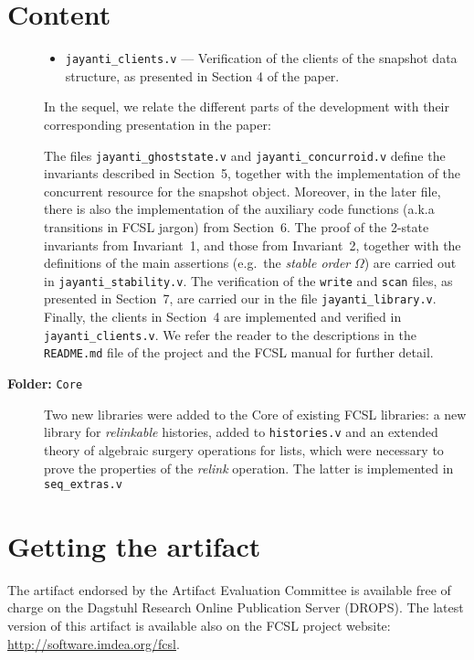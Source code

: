 \documentclass[a4paper,USenglish]{darts}
\newenvironment{content}{\section{Content}}{}
\newenvironment{getting}{\section{Getting the artifact} The artifact 
endorsed by the Artifact Evaluation Committee is available free of 
charge on the Dagstuhl Research Online Publication Server (DROPS).}{}
\begin{document}
\begin{content}
\begin{description}
\begin{itemize}
 \item \texttt{jayanti\_clients.v} --- Verification of the clients of
   the snapshot data structure, as presented in Section 4 of the
   paper.
\end{itemize}

In the sequel, we relate the different parts of the development with
their corresponding presentation in the paper:

The files \texttt{jayanti\_ghoststate.v} and
\texttt{jayanti\_concurroid.v} define the invariants described in
Section~5, together with the implementation of the concurrent resource
for the snapshot object. Moreover, in the later file, there is also
the implementation of the auxiliary code functions (a.k.a transitions
in FCSL jargon) from Section~6. The proof of the 2-state invariants
from Invariant~1, and those from Invariant~2, together with the
definitions of the main assertions (e.g.\ the {\it stable order}
$\Omega$) are carried out in \texttt{jayanti\_stability.v}. The
verification of the \texttt{write} and \texttt{scan} files, as
presented in Section~7, are carried our in the file
\texttt{jayanti\_library.v}. Finally, the clients in Section~4 are
implemented and verified in \texttt{jayanti\_clients.v}. We refer the
reader to the descriptions in the \texttt{README.md} file of the
project and the FCSL manual for further detail.

  \item [{\bf \large Folder:} \texttt{Core}] Two new libraries were
    added to the Core of existing FCSL libraries: a new library for
    {\it relinkable} histories, added to \texttt{histories.v} and an
    extended theory of algebraic surgery operations for lists, which
    were necessary to prove the properties of the {\it relink}
    operation. The latter is implemented in \texttt{seq\_extras.v}
\end{description}
\end{content} 

\begin{getting}
  The latest version of this artifact is available also on the FCSL
  project website: \url{http://software.imdea.org/fcsl}.
\end{getting} 
\end{document}
